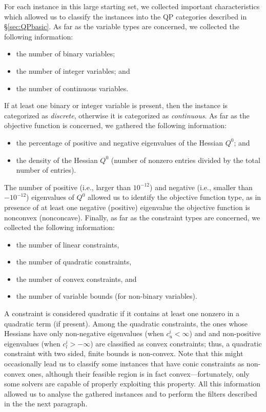 For each instance in this large starting set,
we collected important characteristics
which allowed us to classify the instances into the QP categories described in
\S\ref{sec:QPbasic}. As far as the variable types are concerned, we
collected the following information:
%
\begin{itemize}
 \item the number of binary variables; %
 \item the number of integer variables; and %
 \item the number of continuous variables. %
\end{itemize}
%
If at least one binary or integer variable is present, then the instance is
categorized as \emph{discrete}, otherwise it is categorized as \emph{continuous}.
As far as the objective function is concerned, we gathered the following
information:
%
\begin{itemize}
 \item the percentage of positive and negative eigenvalues of the Hessian
      $Q^0$; and
 \item the density of the Hessian $Q^0$ (number of nonzero entries divided by the total
       number of entries). %
\end{itemize}
%

The number of positive (i.e., larger than $10^{-12}$) and negative (i.e., smaller than $-10^{-12}$) eigenvalues of $Q^0$ allowed us to identify the
objective function type, as in presence of at least one negative (positive) eigenvalue
the objective function is nonconvex (nonconcave). Finally, as far as the constraint types
are concerned, we collected the following information:
%
\begin{itemize}
 \item the number of linear constraints, %
 \item the number of quadratic constraints, %
 \item the number of convex constraints, and %
 \item the number of variable bounds (for non-binary variables). %
\end{itemize}
%
A constraint is considered quadratic if it contains at least one nonzero in
a quadratic term (if present). Among the quadratic constraints, the ones whose
Hessians have only non-negative eigenvalues (when $c_u^i < \infty$) and
and non-positive eigenvalues (when $c_l^i > - \infty$)
are classified as convex constraints; thus, a quadratic constraint with
two sided, finite bounds is non-convex.
Note that this might occasionally lead us to classify some instances that have conic constraints as non-convex ones, although their feasible region is in fact convex---fortunately, only some solvers are capable of properly exploiting this property.
 All this information allowed us to analyse the gathered instances and to perform the
filters described in the the next paragraph.

